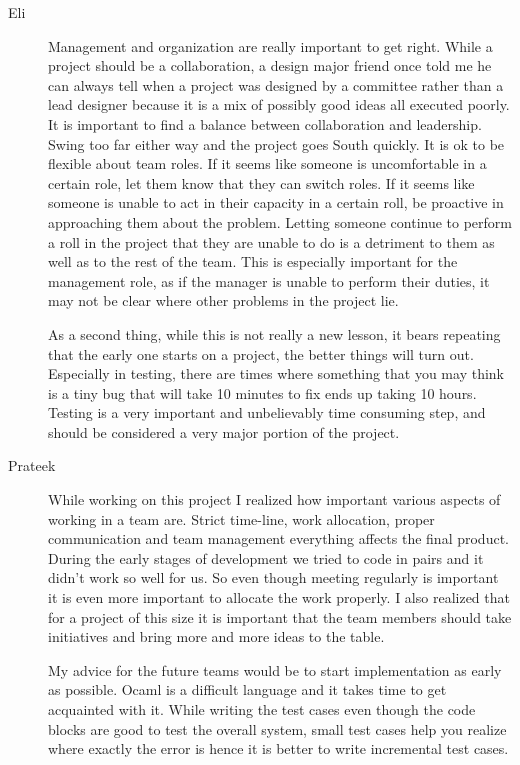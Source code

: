 \documentclass[a4paper]{article}
\begin{document}
\begin{description}
\item[Eli]
\par Management and organization are really important to get right. While a project should be a collaboration, a design major friend once told me he can always tell when a project was designed by a committee rather than a lead designer because it is a mix of possibly good ideas all executed poorly. It is important to find a balance between collaboration and leadership. Swing too far either way and the project goes South quickly. It is ok to be flexible about team roles. If it seems like someone is uncomfortable in a certain role, let them know that they can switch roles. If it seems like someone is unable to act in their capacity in a certain roll, be proactive in approaching them about the problem. Letting someone continue to perform a roll in the project that they are unable to do is a detriment to them as well as to the rest of the team. This is especially important for the management role, as if the manager is unable to perform their duties, it may not be clear where other problems in the project lie.
\par As a second thing, while this is not really a new lesson, it bears repeating that the early one starts on a project, the better things will turn out. Especially in testing, there are times where something that you may think is a tiny bug that will take 10 minutes to fix ends up taking 10 hours. Testing is a very important and unbelievably time consuming step, and should be considered a very major portion of the project.

\item[Prateek]
\par While working on this project I realized how important various aspects of working in a team are. Strict time-line, work allocation, proper communication and team management everything affects the final product. During the early stages of development we tried to code in pairs and it didn't work so well for us. So even though meeting regularly is important it is even more important to allocate the work properly. I also realized that for a project of this size it is important that the team members should take initiatives and bring more and more ideas to the table.
\par My advice for the future teams would be to start implementation as early as possible. Ocaml is a difficult language and it takes time to get acquainted with it. While writing the test cases even though the code blocks are good to test the overall system, small test cases help you realize where exactly the error is hence it is better to write incremental test cases.

\end{description}
\end{document}
